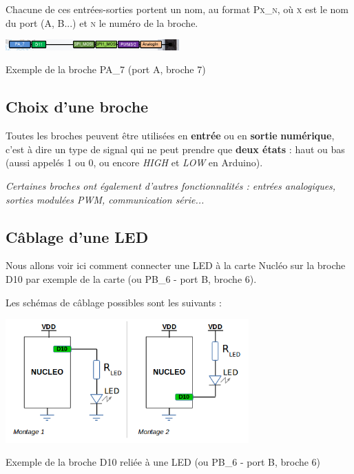 \documentclass[a4paper,11pt,titlepage]{article} %
\begin{document}
Chacune de ces entrées-sorties portent un nom, au format \textsc{Px\_n}, où \textsc{x} est le nom du port (A, B...) et \textsc{n} le numéro de la broche.

\begin{center}
	\includegraphics[width=0.5\textwidth]{images/nucleo_pin_functions.png}
	
	Exemple de la broche PA\_7 (port A, broche 7)
\end{center}


\subsection{Choix d'une broche}

Toutes les broches peuvent être utilisées en \textbf{entrée} ou en \textbf{sortie} \textbf{numérique}, c'est à dire un type de signal qui ne peut prendre que \textbf{deux états} : haut ou bas (aussi appelés 1 ou 0, ou encore \textit{HIGH} et \textit{LOW} en Arduino). 

\textit{Certaines broches ont également d'autres fonctionnalités : entrées analogiques, sorties modulées PWM, communication série...}


\subsection{Câblage d'une LED}

Nous allons voir ici comment connecter une LED à la carte Nucléo sur la broche D10 par exemple de la carte (ou PB\_6 - port B, broche 6).

Les schémas de câblage possibles sont les suivants :

\begin{center}
	\includegraphics[width=0.7\textwidth]{images/MINE_Nucleo_LED_Connexion.png}
	
	Exemple de la broche D10 reliée à une LED (ou PB\_6 - port B, broche 6)
\end{center}
\end{document}

